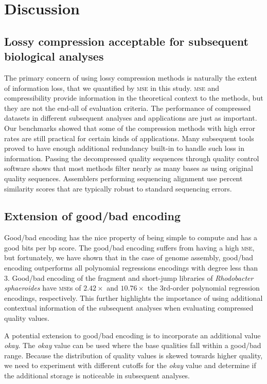 \documentclass{bioinfo}
\begin{document}
\section{Discussion}

\subsection{Lossy compression acceptable for subsequent biological analyses}

The primary concern of using lossy compression methods is naturally the extent of information loss, that we quantified by \textsc{mse} in this study. \textsc{mse} and compressibility provide information in the theoretical context to the methods, but they are not the end-all of evaluation criteria. The performance of compressed datasets in different subsequent analyses and applications are just as important. Our benchmarks showed that some of the compression methods with high error rates are still practical for certain kinds of applications. Many subsequent tools proved to have enough additional redundancy built-in to handle such loss in information.
Passing the decompressed quality sequences through quality control software shows that most methods filter nearly as many bases as using original quality sequences.
Assemblers performing sequencing alignment use percent similarity scores that are typically robust to standard sequencing errors. 


\subsection{Extension of good/bad encoding}


Good/bad encoding has the nice property of being simple to compute and has a good bits per bp score. The good/bad encoding suffers from having a high \textsc{mse}, but fortunately, we have shown that in the case of genome assembly, good/bad encoding outperforms all polynomial regressions encodings with degree less than 3. Good/bad encoding of the fragment and short-jump libraries of \textit{Rhodobacter sphaeroides} have \textsc{mse}s of $2.42\times$ and $10.76\times$ the 3rd-order polynomial regression encodings, respectively. This further highlights the importance of using additional contextual information of the subsequent analyses when evaluating compressed quality values.

A potential extension to good/bad encoding is to incorporate an additional value \emph{okay}.  The \emph{okay} value can be used where the base qualities fall within a good/bad range. Because the distribution of quality values is skewed towards higher quality, we need to experiment with different cutoffs for the \emph{okay} value and determine if the additional storage is noticeable in subsequent analyses.
\end{document}

